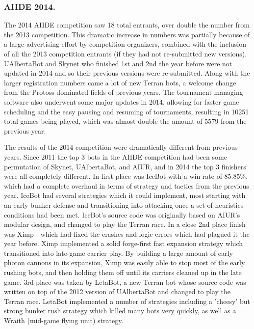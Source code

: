 \documentclass{llncs}
\begin{document}
\subsubsection*{AIIDE 2014.}

The 2014 AIIDE competition saw 18 total entrants, over double the number from the 2013 competition. This dramatic increase in numbers was partially because of a large advertising effort by competition organizers, combined with the inclusion of all the 2013 competition entrants (if they had not re-submitted new versions). UAlbertaBot and Skynet who finished 1st and 2nd the year before were not updated in 2014 and so their previous versions were re-submitted. Along with the larger registration numbers came a lot of new Terran bots, a welcome change from the Protoss-dominated fields of previous years. The tournament managing software also underwent some major updates in 2014, allowing for faster game scheduling and the easy pausing and resuming of tournaments, resulting in 10251 total games being played, which was almost double the amount of 5579 from the previous year.

The results of the 2014 competition were dramatically different from previous years. Since 2011 the top 3 bots in the AIIDE competition had been some permutation of Skynet, UAlbertaBot, and AIUR, and in 2014 the top 3 finishers were all completely different. In first place was IceBot with a win rate of 85.85\%, which had a complete overhaul in terms of strategy and tactics from the previous year. IceBot had several strategies which it could implement, most starting with an early bunker defense and transitioning into attacking once a set of heuristics conditions had been met. IceBot's source code was originally based on AIUR's modular design, and changed to play the Terran race. In a close 2nd place finish was Ximp - which had fixed the crashes and logic errors which had plagued it the year before. Ximp implemented a solid forge-first fast expansion strategy which transitioned into late-game carrier play. By building a large amount of early photon cannons in its expansion, Ximp was easily able to stop most of the early rushing bots, and then holding them off until its carriers cleaned up in the late game. 3rd place was taken by LetaBot, a new Terran bot whose source code was written on top of the 2012 version of UAlbertaBot and changed to play the Terran race. LetaBot implemented a number of strategies including a 'cheesy' but strong bunker rush strategy which killed many bots very quickly, as well as a Wraith (mid-game flying unit) strategy. 
\end{document}
